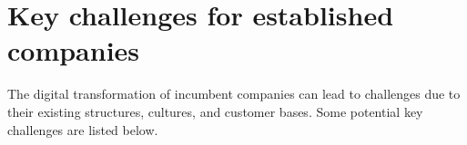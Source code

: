 \documentclass[a4]{scrartcl}
\begin{document}
	







\newpage
\section{Key challenges for established companies} \label{sec:Sec2}
	
	The digital transformation of incumbent companies can lead to challenges due to their existing structures, cultures, and customer bases. Some potential key challenges are listed below.
\end{document}
